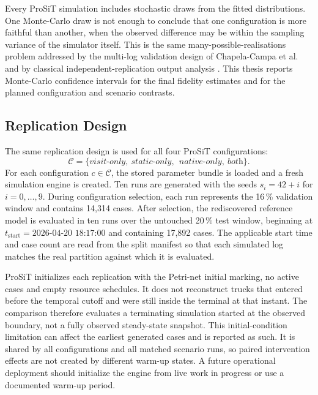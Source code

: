 Every ProSiT simulation includes stochastic draws from the fitted
distributions. One Monte-Carlo draw is not enough to conclude that one configuration is more faithful than
another, when the observed difference may be within the sampling variance
of the simulator itself. This is the same many-possible-realisations
problem addressed by the multi-log validation design of
Chapela-Campa et al. and by classical independent-replication output
analysis \cite{ChapelaCampa2023Trust,Law2015Simulation}. This thesis
reports Monte-Carlo confidence intervals for the final fidelity estimates
and for the planned configuration and scenario contrasts.

\subsection{Replication Design}

The same replication design is used for all four ProSiT configurations:
\begin{equation}
\mathcal{C}=\{\textit{visit-only},\ \textit{static-only},\
\ \textit{native-only},\ \textit{both}\}.
\end{equation}
For each configuration $c\in\mathcal{C}$, the stored parameter bundle is
loaded and a fresh simulation engine is created. Ten runs are generated with
the seeds $s_i=42+i$ for $i=0,\ldots,9$. During configuration selection, each
run represents the 16\,\% validation window and contains 14,314 cases. After
selection, the rediscovered reference model is evaluated in ten runs over the
untouched 20\,\% test window, beginning at
$t_{\mathrm{start}}=\text{2026-04-20 18:17:00}$ and containing 17,892 cases.
The applicable start time and case count are read from the split manifest so
that each simulated log matches the real partition against which it is
evaluated.

ProSiT initializes each replication with the Petri-net initial marking, no
active cases and empty resource schedules. It does not reconstruct trucks that
entered before the temporal cutoff and were still inside the terminal at that
instant. The comparison therefore evaluates a terminating simulation started
at the observed boundary, not a fully observed steady-state snapshot. This
initial-condition limitation can affect the earliest generated cases and is
reported as such. It is shared by all configurations and all matched scenario
runs, so paired intervention effects are not created by different warm-up
states. A future operational deployment should initialize the engine from live
work in progress or use a documented warm-up period.

